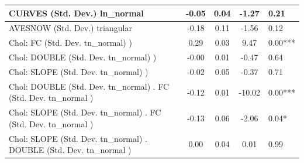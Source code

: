 \begin{table}
\begin{center}
\begin{tabular}{|l|l|c|c|c|l|}
			\hline
			CURVES (Std. Dev.) ln_normal &  & -0.05 & 0.04 & -1.27 & 0.21 \\
			\hline
			AVESNOW (Std. Dev.) triangular &  & -0.18 & 0.11 & -1.56 & 0.12 \\
			\hline
			 Chol: FC (Std. Dev. tn_normal) ) &  & 0.29 & 0.03 & 9.47 & 0.00*** \\
			\hline
			 Chol: DOUBLE (Std. Dev. tn_normal) ) &  & -0.00 & 0.01 & -0.47 & 0.64 \\
			\hline
			 Chol: SLOPE (Std. Dev. tn_normal) ) &  & -0.02 & 0.05 & -0.37 & 0.71 \\
			\hline
			 Chol: DOUBLE (Std. Dev. tn_normal) . FC (Std. Dev.   tn_normal ) &  & -0.12 & 0.01 & -10.02 & 0.00*** \\
			\hline
			 Chol: SLOPE (Std. Dev. tn_normal) . FC (Std. Dev.   tn_normal ) &  & -0.13 & 0.06 & -2.06 & 0.04* \\
			\hline
			 Chol: SLOPE (Std. Dev. tn_normal) . DOUBLE (Std. Dev.   tn_normal ) &  & 0.00 & 0.04 & 0.01 & 0.99 \\
			\hline
		\end{tabular}
	\end{center}
\end{table}